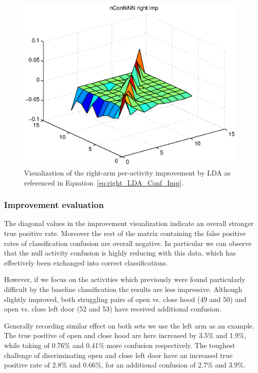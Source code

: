 \documentclass{sig-alternate}
\begin{document}
\begin{figure}
  \centering
  \includegraphics[scale=0.35]{./matlab_output/nConfkNN_right_imp_LDA_3.eps}
  \caption{Visualization of the right-arm per-activity improvement by LDA as referenced in Equation~\ref{eq:right_LDA_Conf_Imp}.}
  \label{fig:conf_right_imp_surf}
\end{figure}

\subsubsection{Improvement evaluation}
The diagonal values in the improvement visualization indicate an overall stronger true positive rate. Moreover the rest of the matrix containing the false positive rates of classification confusion are overall negative.  In particular we can observe that the null activity confusion is highly reducing with this data, which has effectively been exchanged into correct classifications.

However, if we focus on the activities which previously were found particularly difficult by the baseline classification the results are less impressive. Although slightly improved, both struggling pairs of open vs. close hood (49 and 50) and open vs. close left door (52 and 53) have received additional confusion.

Generally recording similar effect on both sets we use the left arm as an example. The true positive of open and close hood are here increased by 3.5\% and 1.9\%, while taking of 0.76\% and 0.41\% more confusion respectively. The toughest challenge of discriminating open and close left door have an increased true positive rate of 2.8\% and 0.66\%, for an additional confusion of 2.7\% and 3.9\%.
\end{document}
